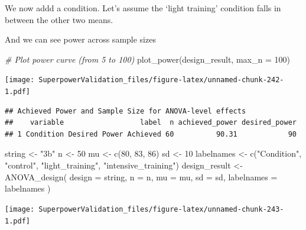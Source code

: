 \documentclass[
]{book}
\newenvironment{Shaded}{\begin{snugshade}}{\end{snugshade}}
\newcommand{\AttributeTok}[1]{\textcolor[rgb]{0.77,0.63,0.00}{#1}}
\newcommand{\CommentTok}[1]{\textcolor[rgb]{0.56,0.35,0.01}{\textit{#1}}}
\newcommand{\DecValTok}[1]{\textcolor[rgb]{0.00,0.00,0.81}{#1}}
\newcommand{\FunctionTok}[1]{\textcolor[rgb]{0.00,0.00,0.00}{#1}}
\newcommand{\NormalTok}[1]{#1}
\newcommand{\OtherTok}[1]{\textcolor[rgb]{0.56,0.35,0.01}{#1}}
\newcommand{\SpecialCharTok}[1]{\textcolor[rgb]{0.00,0.00,0.00}{#1}}
\newcommand{\StringTok}[1]{\textcolor[rgb]{0.31,0.60,0.02}{#1}}
\begin{document}
We now addd a condition. Let's assume the `light training' condition falls in between the other two means.

And we can see power across sample sizes

\begin{Shaded}
\begin{Highlighting}[]
\CommentTok{\# Plot power curve (from 5 to 100)}
\FunctionTok{plot\_power}\NormalTok{(design\_result, }\AttributeTok{max\_n =} \DecValTok{100}\NormalTok{)}
\end{Highlighting}
\end{Shaded}

\texttt{[image: SuperpowerValidation\_files/figure-latex/unnamed-chunk-242-1.pdf]}

\begin{verbatim}
## Achieved Power and Sample Size for ANOVA-level effects
##    variable                  label  n achieved_power desired_power
## 1 Condition Desired Power Achieved 60          90.31            90
\end{verbatim}

\begin{Shaded}
\begin{Highlighting}[]
\NormalTok{string }\OtherTok{\textless{}{-}} \StringTok{"3b"}
\NormalTok{n }\OtherTok{\textless{}{-}} \DecValTok{50}
\NormalTok{mu }\OtherTok{\textless{}{-}} \FunctionTok{c}\NormalTok{(}\DecValTok{80}\NormalTok{, }\DecValTok{83}\NormalTok{, }\DecValTok{86}\NormalTok{)}
\NormalTok{sd }\OtherTok{\textless{}{-}} \DecValTok{10}
\NormalTok{labelnames }\OtherTok{\textless{}{-}} \FunctionTok{c}\NormalTok{(}\StringTok{"Condition"}\NormalTok{, }\StringTok{"control"}\NormalTok{, }\StringTok{"light\_training"}\NormalTok{, }\StringTok{"intensive\_training"}\NormalTok{)}
\NormalTok{design\_result }\OtherTok{\textless{}{-}} \FunctionTok{ANOVA\_design}\NormalTok{(}
  \AttributeTok{design =}\NormalTok{ string,}
  \AttributeTok{n =}\NormalTok{ n,}
  \AttributeTok{mu =}\NormalTok{ mu,}
  \AttributeTok{sd =}\NormalTok{ sd,}
  \AttributeTok{labelnames =}\NormalTok{ labelnames}
\NormalTok{)}
\end{Highlighting}
\end{Shaded}

\texttt{[image: SuperpowerValidation\_files/figure-latex/unnamed-chunk-243-1.pdf]}

\begin{Shaded}
\end{Shaded}
\end{document}
